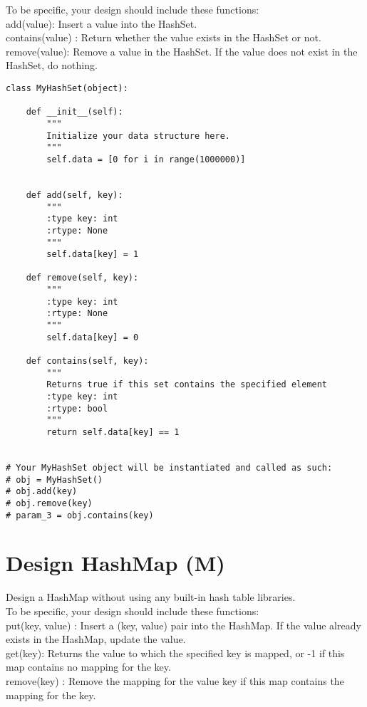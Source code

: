 To be specific, your design should include these functions:\\

    add(value): Insert a value into the HashSet. \\
    contains(value) : Return whether the value exists in the HashSet or not.\\
    remove(value): Remove a value in the HashSet. If the value does not exist in the HashSet, do nothing.\\

\begin{lstlisting}
class MyHashSet(object):

    def __init__(self):
        """
        Initialize your data structure here.
        """
        self.data = [0 for i in range(1000000)]
        

    def add(self, key):
        """
        :type key: int
        :rtype: None
        """
        self.data[key] = 1

    def remove(self, key):
        """
        :type key: int
        :rtype: None
        """
        self.data[key] = 0

    def contains(self, key):
        """
        Returns true if this set contains the specified element
        :type key: int
        :rtype: bool
        """
        return self.data[key] == 1


# Your MyHashSet object will be instantiated and called as such:
# obj = MyHashSet()
# obj.add(key)
# obj.remove(key)
# param_3 = obj.contains(key)
\end{lstlisting}

\section{Design HashMap (M)}
Design a HashMap without using any built-in hash table libraries.\\

To be specific, your design should include these functions:\\
    put(key, value) : Insert a (key, value) pair into the HashMap. If the value already exists in the HashMap, update the value.\\
    get(key): Returns the value to which the specified key is mapped, or -1 if this map contains no mapping for the key.\\
    remove(key) : Remove the mapping for the value key if this map contains the mapping for the key.\\

